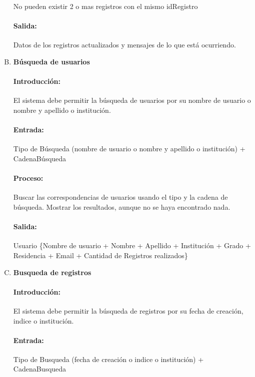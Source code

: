 \begin{enumerate}[A.]
        No pueden existir 2 o mas registros con el mismo idRegistro
        
        \paragraph{Salida:} Datos de los registros actualizados y mensajes de lo que está ocurriendo.
        
        \item \textbf{Búsqueda de usuarios}
        
        \paragraph{Introducción:}El sistema debe permitir la búsqueda de usuarios por su nombre de usuario o nombre y apellido o institución. 
        
        \paragraph{Entrada:} Tipo de Búsqueda (nombre de usuario o nombre y apellido o institución) + CadenaBúsqueda
        
        \paragraph{Proceso:} Buscar las correspondencias de usuarios usando el tipo y la cadena de búsqueda. Mostrar los resultados, aunque no se haya encontrado nada.
        
        \paragraph{Salida:} Usuario \{Nombre de usuario + Nombre + Apellido + Institución + Grado + Residencia + Email + Cantidad de Registros realizados\}
        
         \item \textbf{Busqueda de registros}
        
        \paragraph{Introducción:} El sistema debe permitir la búsqueda de registros por su fecha de creación, indice o institución.
        \paragraph{Entrada:} Tipo de Busqueda (fecha de creación o indice o institución) + CadenaBusqueda
        

\end{enumerate}
